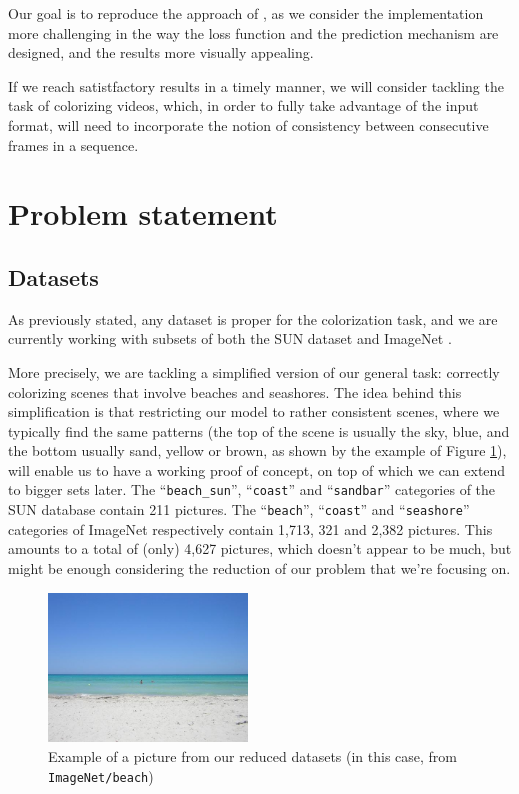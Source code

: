 \documentclass[10pt,twocolumn,letterpaper]{article}
\begin{document}
Our goal is to reproduce the approach of \cite{zhang2016colorful}, as we consider the implementation more challenging in the way the loss function and the prediction mechanism are designed, and the results more visually appealing.

If we reach satistfactory results in a timely manner, we will consider tackling the task of colorizing videos, which, in order to fully take advantage of the input format, will need to incorporate the notion of consistency between consecutive frames in a sequence.

\section{Problem statement}

\subsection{Datasets}

As previously stated, any dataset is proper for the colorization task, and we are currently working with subsets of both the SUN dataset \cite{xiao2010sun} and ImageNet \cite{russakovsky2015imagenet}.

More precisely, we are tackling a simplified version of our general task: correctly colorizing scenes that involve beaches and seashores. The idea behind this simplification is that restricting our model to rather consistent scenes, where we typically find the same patterns (the top of the scene is usually the sky, \ie blue, and the bottom usually sand, \ie yellow or brown, as shown by the example of Figure \ref{inex}), will enable us to have a working proof of concept, on top of which we can extend to bigger sets later. The ``\texttt{beach\_sun}'', ``\texttt{coast}'' and ``\texttt{sandbar}'' categories of the SUN database contain 211 pictures. The ``\texttt{beach}'', ``\texttt{coast}'' and ``\texttt{seashore}'' categories of ImageNet respectively contain 1,713, 321 and 2,382 pictures. This amounts to a total of (only) 4,627 pictures, which doesn't appear to be much, but might be enough considering the reduction of our problem that we're focusing on.

\begin{figure}
\begin{center}
\includegraphics[width=200px]{img/beach.jpg}
\caption{Example of a picture from our reduced datasets (in this case, from \texttt{ImageNet/beach})}
\label{inex}
\end{center}
\end{figure}
\end{document}
